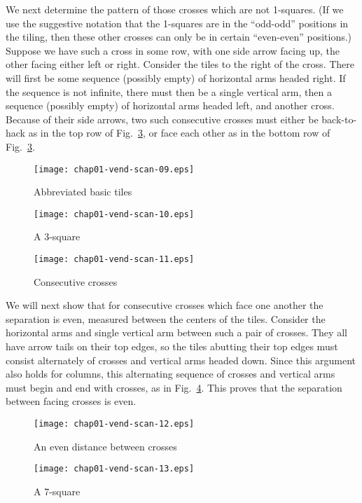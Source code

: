 \documentclass[reqno]{stml-l}
\theoremstyle{plain}
\theoremstyle{definition}
\numberwithin{equation}{chapter}
\begin{document}
We next determine the pattern of those crosses which are not 1-squares. (If we use the suggestive notation that the 1-squares are in the ``odd-odd'' positions in the tiling, then these other crosses can only be in certain ``even-even'' positions.) Suppose we have such a cross in
some row, with one side arrow facing up, the other facing either left or right. Consider the tiles to the right of the cross. There will first be some sequence (possibly empty) of horizontal arms headed right. If the sequence is not infinite, there must then be a single vertical arm, then a sequence (possibly empty) of horizontal arms headed left, and another cross. Because of their side arrows, two such consecutive
crosses must either be back-to-hack as in the top row of Fig.~\ref{ch01:fig24}, or face each other as in the bottom row of Fig.~\ref{ch01:fig24}.

\begin{figure}[h]
\texttt{[image: chap01-vend-scan-09.eps]}
\caption{Abbreviated basic tiles }
\label{ch01:fig22}
\end{figure}

\begin{figure}[h]
\texttt{[image: chap01-vend-scan-10.eps]}
\caption{A 3-square}
\label{ch01:fig23}
\end{figure}

\begin{figure}[h]
\texttt{[image: chap01-vend-scan-11.eps]}
\caption{Consecutive crosses }
\label{ch01:fig24}
\end{figure}

We will next show that for consecutive crosses which face one another the separation is even, measured between the centers of the tiles. Consider the horizontal arms and single vertical arm between such a pair of crosses. They all have arrow tails on their top edges, so the tiles abutting their top edges must consist alternately of crosses and vertical arms headed down. Since this argument also holds for columns, this alternating sequence of crosses and vertical arms must begin and end with crosses, as in Fig.~\ref{ch01:fig25}. This proves that the separation between facing crosses is even.

\begin{figure}[h]
\texttt{[image: chap01-vend-scan-12.eps]}
\caption{An even distance between crosses }
\label{ch01:fig25}
\end{figure}

\begin{figure}[h]
\texttt{[image: chap01-vend-scan-13.eps]}
\caption{A 7-square}
\label{ch01:fig26}
\end{figure}
\end{document}
